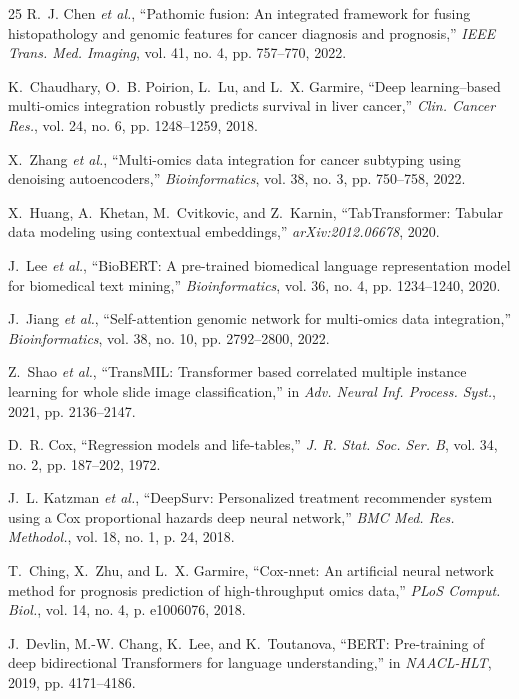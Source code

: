 \documentclass[conference]{IEEEtran}
\begin{document}
\begin{thebibliography}{25}
R.~J. Chen \emph{et al.}, ``Pathomic fusion: An integrated framework for fusing histopathology and genomic features for cancer diagnosis and prognosis,'' \emph{IEEE Trans. Med. Imaging}, vol. 41, no. 4, pp. 757--770, 2022.

K.~Chaudhary, O.~B. Poirion, L.~Lu, and L.~X. Garmire, ``Deep learning--based multi-omics integration robustly predicts survival in liver cancer,'' \emph{Clin. Cancer Res.}, vol. 24, no. 6, pp. 1248--1259, 2018.

X.~Zhang \emph{et al.}, ``Multi-omics data integration for cancer subtyping using denoising autoencoders,'' \emph{Bioinformatics}, vol. 38, no. 3, pp. 750--758, 2022.

X.~Huang, A.~Khetan, M.~Cvitkovic, and Z.~Karnin, ``TabTransformer: Tabular data modeling using contextual embeddings,'' \emph{arXiv:2012.06678}, 2020.

J.~Lee \emph{et al.}, ``BioBERT: A pre-trained biomedical language representation model for biomedical text mining,'' \emph{Bioinformatics}, vol. 36, no. 4, pp. 1234--1240, 2020.

J.~Jiang \emph{et al.}, ``Self-attention genomic network for multi-omics data integration,'' \emph{Bioinformatics}, vol. 38, no. 10, pp. 2792--2800, 2022.

Z.~Shao \emph{et al.}, ``TransMIL: Transformer based correlated multiple instance learning for whole slide image classification,'' in \emph{Adv. Neural Inf. Process. Syst.}, 2021, pp. 2136--2147.

D.~R. Cox, ``Regression models and life-tables,'' \emph{J. R. Stat. Soc. Ser. B}, vol. 34, no. 2, pp. 187--202, 1972.

J.~L. Katzman \emph{et al.}, ``DeepSurv: Personalized treatment recommender system using a Cox proportional hazards deep neural network,'' \emph{BMC Med. Res. Methodol.}, vol. 18, no. 1, p. 24, 2018.

T.~Ching, X.~Zhu, and L.~X. Garmire, ``Cox-nnet: An artificial neural network method for prognosis prediction of high-throughput omics data,'' \emph{PLoS Comput. Biol.}, vol. 14, no. 4, p. e1006076, 2018.

J.~Devlin, M.-W. Chang, K.~Lee, and K.~Toutanova, ``BERT: Pre-training of deep bidirectional Transformers for language understanding,'' in \emph{NAACL-HLT}, 2019, pp. 4171--4186.


\end{thebibliography}
\end{document}
